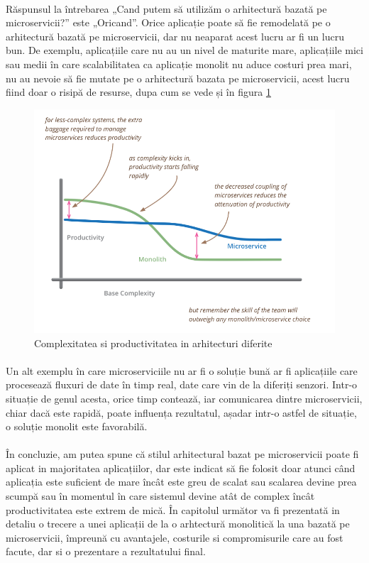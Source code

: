 \documentclass[12pt]{report}
\begin{document}
  	\paragraph{} Răspunsul la întrebarea „Cand putem să utilizăm o arhitectură bazată pe microservicii?” este „Oricand”. Orice aplicație poate să fie remodelată pe o arhitectură bazată pe microservicii, dar nu neaparat acest lucru ar fi un lucru bun. De exemplu, aplicațiile care nu au un nivel de maturite mare, aplicațiile mici sau medii în care scalabilitatea ca aplicație monolit nu aduce costuri prea mari, nu au nevoie să fie mutate pe o arhitectură bazata pe microservicii, acest lucru fiind doar o risipă de resurse, dupa cum se vede și în figura \ref{fowler}
  	\begin{figure}[h]
  	\centering
  	\includegraphics[scale=0.9]{fowler}
	\caption{Complexitatea si productivitatea in arhitecturi diferite \cite{fowler2}}
	\label{fowler}
  	\end{figure}
  	\paragraph{}Un alt exemplu în care microserviciile nu ar fi o soluție bună ar fi aplicațiile care procesează fluxuri de date în timp real, date care vin de la diferiți senzori. Intr-o situație de genul acesta, orice timp contează, iar comunicarea dintre microservicii, chiar dacă este rapidă, poate influența rezultatul, așadar intr-o astfel de situație, o soluție monolit este favorabilă.
  	\paragraph{}În concluzie, am putea spune că stilul arhitectural bazat pe microservicii poate fi aplicat in majoritatea aplicațiilor, dar este indicat să fie folosit doar atunci când aplicația este suficient de mare încât este greu de scalat sau scalarea devine prea scumpă sau în momentul în care sistemul devine atât de complex încât productivitatea este extrem de mică. În capitolul următor va fi prezentată in detaliu o trecere a unei aplicații de la o arhtectură monolitică la una bazată pe microservicii, împreună cu avantajele, costurile si compromisurile care au fost facute, dar si o prezentare a rezultatului final.
\end{document}
